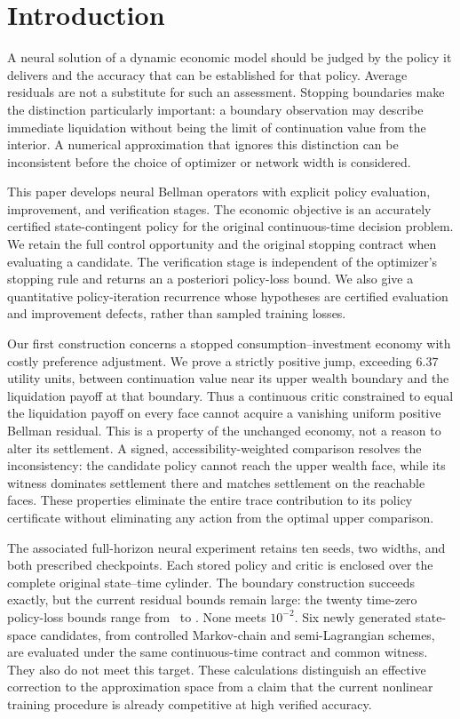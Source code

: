 \section{Introduction}\label{sec:introduction}
A neural solution of a dynamic economic model should be judged by the policy it delivers and the accuracy that can be established for that policy. Average residuals are not a substitute for such an assessment. Stopping boundaries make the distinction particularly important: a boundary observation may describe immediate liquidation without being the limit of continuation value from the interior. A numerical approximation that ignores this distinction can be inconsistent before the choice of optimizer or network width is considered.

This paper develops neural Bellman operators with explicit policy evaluation, improvement, and verification stages. The economic objective is an accurately certified state-contingent policy for the original continuous-time decision problem. We retain the full control opportunity and the original stopping contract when evaluating a candidate. The verification stage is independent of the optimizer's stopping rule and returns an a posteriori policy-loss bound. We also give a quantitative policy-iteration recurrence whose hypotheses are certified evaluation and improvement defects, rather than sampled training losses.

Our first construction concerns a stopped consumption--investment economy with costly preference adjustment. We prove a strictly positive jump, exceeding $6.37$ utility units, between continuation value near its upper wealth boundary and the liquidation payoff at that boundary. Thus a continuous critic constrained to equal the liquidation payoff on every face cannot acquire a vanishing uniform positive Bellman residual. This is a property of the unchanged economy, not a reason to alter its settlement. A signed, accessibility-weighted comparison resolves the inconsistency: the candidate policy cannot reach the upper wealth face, while its witness dominates settlement there and matches settlement on the reachable faces. These properties eliminate the entire trace contribution to its policy certificate without eliminating any action from the optimal upper comparison.

The associated full-horizon neural experiment retains ten seeds, two widths, and both prescribed checkpoints. Each stored policy and critic is enclosed over the complete original state--time cylinder. The boundary construction succeeds exactly, but the current residual bounds remain large: the twenty time-zero policy-loss bounds range from \RNNMin\ to \RNNMax. None meets $10^{-2}$. Six newly generated state-space candidates, from controlled Markov-chain and semi-Lagrangian schemes, are evaluated under the same continuous-time contract and common witness. They also do not meet this target. These calculations distinguish an effective correction to the approximation space from a claim that the current nonlinear training procedure is already competitive at high verified accuracy.

